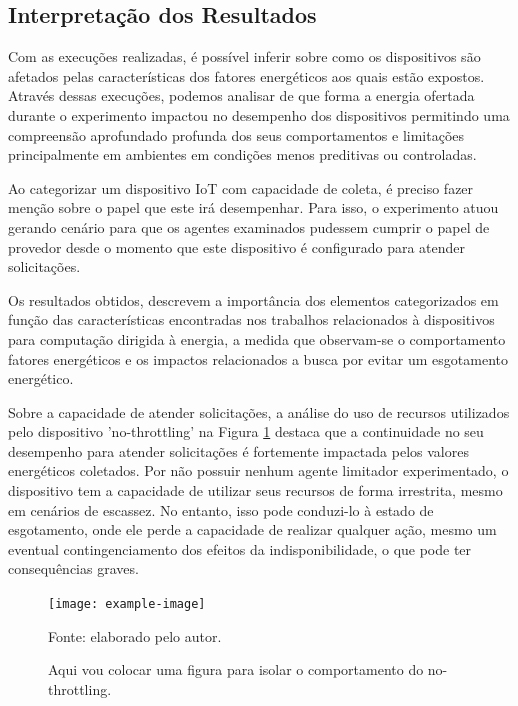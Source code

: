 \subsection{Interpretação dos Resultados}

Com as execuções realizadas, é possível inferir sobre como os dispositivos são afetados pelas características dos fatores energéticos aos quais estão expostos. Através dessas execuções, podemos analisar de que forma a energia ofertada durante o experimento impactou no desempenho dos dispositivos permitindo uma compreensão aprofundado profunda dos seus comportamentos e limitações principalmente em ambientes em condições menos preditivas ou controladas.

Ao categorizar um dispositivo \acs{IoT} com capacidade de coleta, é preciso fazer menção sobre o papel que este irá desempenhar. Para isso, o experimento atuou gerando cenário para que os agentes examinados pudessem cumprir o papel de provedor desde o momento que este dispositivo é configurado para atender solicitações.

Os resultados obtidos, descrevem a importância dos elementos categorizados em função das características encontradas nos trabalhos relacionados à dispositivos para computação dirigida à energia, a medida que observam-se o comportamento fatores energéticos e os impactos relacionados a busca por evitar um esgotamento energético.

Sobre a capacidade de atender solicitações, a análise do uso de recursos utilizados pelo dispositivo 'no-throttling' na Figura \ref{fig:cap6nothrottling} destaca que a continuidade no seu desempenho para atender solicitações é fortemente impactada pelos valores energéticos coletados. Por não possuir nenhum agente limitador experimentado, o dispositivo tem a capacidade de utilizar seus recursos de forma irrestrita, mesmo em cenários de escassez. No entanto, isso pode conduzi-lo à estado de esgotamento, onde ele perde a capacidade de realizar qualquer ação, mesmo um eventual contingenciamento dos efeitos da indisponibilidade, o que pode ter consequências graves.

\begingroup
\begin{figure}[htb]
	
	\centering
	\caption{Aqui vou colocar uma figura para isolar o comportamento do no-throttling.}
	\label{fig:cap6nothrottling}
	\noindent\texttt{[image: example-image]} 
	
	Fonte: elaborado pelo autor.
\end{figure}
\endgroup



